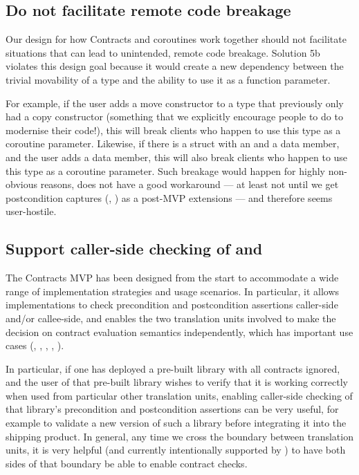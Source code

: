 \subsection{Do not facilitate remote code breakage}

Our design for how Contracts and coroutines work together should not facilitate situations that can lead to unintended, remote code breakage. Solution 5b violates this design goal because it would create a new dependency between the trivial movability of a type and the ability to use it as a function parameter.

For example, if the user adds a move constructor to a type that previously only had a copy constructor (something that we explicitly encourage people to do to modernise their code!), this will break clients who happen to use this type as a coroutine parameter. Likewise, if there is a struct with an  and a  data member, and the user adds a  data member, this will also break clients who happen to use this type as a coroutine parameter. Such breakage would happen for highly non-obvious reasons, does not have a good workaround --- at least not until we get postcondition captures (\cite{P2461R1}, \cite{P3098R0}) as a post-MVP extensions --- and therefore seems user-hostile.

\subsection{Support caller-side checking of  and }

The Contracts MVP has been designed from the start to accommodate a wide range of implementation strategies and usage scenarios. In particular, it allows implementations to check precondition and postcondition assertions caller-side and/or callee-side, and enables the two translation units involved to make the decision on contract evaluation semantics independently, which has important use cases (\cite{P2751R1}, \cite{P3228R1}, \cite{P3119R1}, \cite{P3267R1}, \cite{P3321R0}).

In particular, if one has deployed a pre-built library with all contracts ignored, and the user of that pre-built library wishes to verify that it is working correctly when used from particular other translation units, enabling caller-side checking of that library's precondition and postcondition assertions can be very useful, for example to validate a new version of such a library before integrating it into the shipping product. In general, any time we cross the boundary between translation units, it is very helpful (and currently intentionally supported by \cite{P2900R8}) to have both sides of that boundary be able to enable contract checks.

